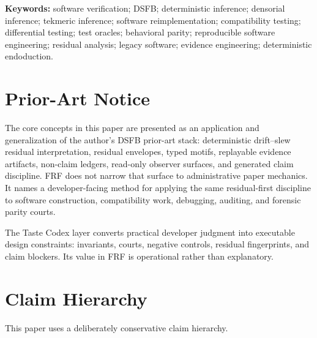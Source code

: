 \documentclass[11pt,a4paper]{article}
\newcommand{\frf}{\textsc{FRF}}
\newcommand{\dsfb}{\textsc{DSFB}}
\begin{document}
\noindent\textbf{Keywords:} software verification; DSFB; deterministic inference; densorial inference; tekmeric inference; software reimplementation; compatibility testing; differential testing; test oracles; behavioral parity; reproducible software engineering; residual analysis; legacy software; evidence engineering; deterministic endoduction.

\section*{Prior-Art Notice}
The core concepts in this paper are presented as an application and generalization of the author's \dsfb{} prior-art stack: deterministic drift--slew residual interpretation, residual envelopes, typed motifs, replayable evidence artifacts, non-claim ledgers, read-only observer surfaces, and generated claim discipline. \frf{} does not narrow that surface to administrative paper mechanics. It names a developer-facing method for applying the same residual-first discipline to software construction, compatibility work, debugging, auditing, and forensic parity courts.

The Taste Codex layer converts practical developer judgment into executable design constraints: invariants, courts, negative controls, residual fingerprints, and claim blockers. Its value in \frf{} is operational rather than explanatory.

\section*{Claim Hierarchy}
This paper uses a deliberately conservative claim hierarchy.
\end{document}
